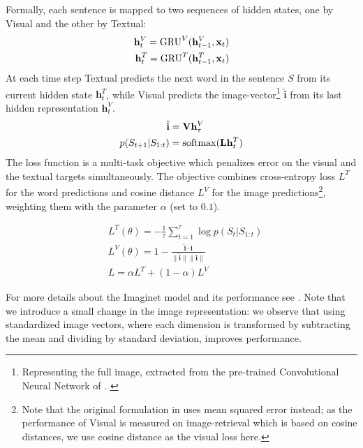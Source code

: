 Formally, each sentence is mapped to two sequences of hidden states,
one by {\sc Visual} and the other by {\sc Textual}:
\vspace{-.2cm}
\begin{align}
  \mathbf{h}^{V}_t = \mathrm{GRU}^V(\mathbf{h}^{V}_{t-1},\mathbf{x}_t)\\
  \mathbf{h}^{T}_t = \mathrm{GRU}^T(\mathbf{h}^{T}_{t-1},\mathbf{x}_t)
\vspace{-.1cm}
\end{align}
%
At each time step {\sc Textual} predicts the next word in the sentence
$S$ from its current hidden state $\mathbf{h}^{T}_t$, while {\sc
  Visual} predicts the image-vector\footnote{Representing the full image,
  extracted from the pre-trained Convolutional Neural Network of
  \citep{simonyan2014very}. \label{edit:dumdumeddy}}
$\hat{\mathbf{i}}$ from its last
hidden representation $\mathbf{h}^{V}_t$.
%
\vspace{-.2cm}
\begin{align}
   \hat{\mathbf{i}} &= \mathbf{V} \mathbf{h}^{V}_\tau \\
    p(S_{t+1}|S_{1:t}) &= \mathrm{softmax}(\mathbf{L}\mathbf{h}^T_t)
\vspace{-.1cm}
\end{align}
%
The loss function is a multi-task objective which penalizes error on
the visual and the textual targets simultaneously. The objective
combines cross-entropy loss $L^{T}$ for the word predictions
and cosine distance $L^V$ for the image
predictions\footnote{Note that the original formulation in
  \citep{chrupala2015learning} uses mean squared error instead; as the performance of
{\sc Visual} is measured on image-retrieval which is based on cosine
distances, we use cosine distance as the visual loss here.\label{ft:imaginet}}, weighting them with the parameter $\alpha$ (set to $0.1$).

\begin{align}
&L^{T}(\theta) = {-} \frac{1}{\tau}\sum_{t=1}^\tau \log p(S_t|S_{1:t}) \\
&L^V(\theta) =  1 - \frac{\hat{\mathbf{i}} \cdot \mathbf{i}}{\| \hat{\mathbf{i}} \| \| \mathbf{i} \|} \\
\label{eq:losscombo}
&L = \alpha L^T + (1-\alpha)L^{V}
\end{align}

\noindent
For more details about the {\sc Imaginet} model and its performance
see \citep{chrupala2015learning}. Note that we introduce a small change in
the image representation: we observe that using standardized image
vectors, where each dimension is transformed by subtracting the mean
and dividing by standard deviation, improves performance.




